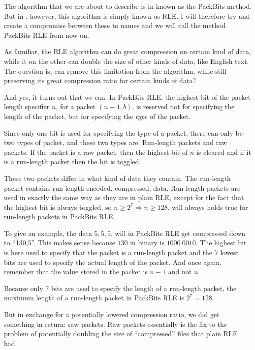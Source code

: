 The algorithm that we are about to describe is in
\cite{96:_techn_note_tn102,apple1994inside} known as the PackBits
method. But in \cite{91:_truev_tga_file_format_specif}, however, this
algorithm is simply known as RLE. I will therefore try and create a
compromise between these to names and we will call the method PackBits
RLE from now on.

As familiar, the RLE algorithm can do great compression on certain
kind of data, while it on the other can double the size of other kinds
of data, like English text. The question is, can remove this
limitation from the algorithm, while still preserving its great
compression ratio for certain kinds of data?

And yes, it turns out that we can. In PackBits RLE, the highest bit of
the packet length specifier $n$, for a packet $(n-1,b)$, is reserved
not for specifying the length of the packet, but for specifying the
\textit{type} of the packet.

Since only one bit is used for specifying the type of a packet, there
can only be two types of packet, and these two types are: Run-length
packets and raw packets. If the packet is a raw packet, then the
highest bit of $n$ is cleared and if it is a run-length packet then
the bit is toggled.

These two packets differ in what kind of data they contain. The
run-length packet contains run-length encoded, compressed,
data. Run-length packets are used in exactly the same way as they are
in plain RLE, except for the fact that the highest bit is always
toggled, so $n \geq 2^7 \Rightarrow n \geq 128$, will always holds true for
run-length packets in PackBits RLE.

To give an example, the data $5,5,5$, will in PackBits RLE get
compressed down to ``130,5''. This makes sense because $130$ in binary
is $1000\ 0010$. The highest bit is here used to specify that the
packet is a run-length packet and the 7 lowest bits are used to
specify the actual length of the packet. And once again, remember that
the value stored in the packet is $n-1$ and not $n$.

Because only 7 bits are used to specify the length of a run-length
packet, the maximum length of a run-length packet in PackBits RLE is
$2^7 = 128$.

But in exchange for a potentially lowered compression ratio, we did
get something in return: raw packets. Raw packets essentially is the
fix to the problem of potentially doubling the size of ``compressed''
files that plain RLE had.

